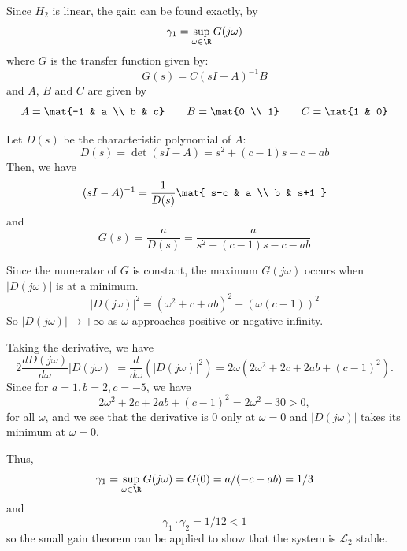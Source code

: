 \documentclass{homework}
\renewcommand{\L}{\mathcal{L}}
\begin{document}
Since $H_2$ is linear, the gain can be found exactly, by
\begin{equation*}
    \gamma_1 = \sup_{\omega \in \R} G(j\omega)
\end{equation*}
where $G$ is the transfer function given by:
\begin{equation*}
    G(s) = C(sI - A)^{-1} B
\end{equation*}
and $A$, $B$ and $C$ are given by
\begin{equation*}
    A = \mat{-1 & a \\ b & c} \qquad B = \mat{0 \\ 1}
        \qquad C = \mat{1 & 0}
\end{equation*}

Let $D(s)$ be the characteristic polynomial of $A$:
\begin{equation*}
    D(s) = \det(sI - A) = s^2 + (c - 1) s - c - ab
\end{equation*}
Then,  we have 
\begin{equation*}
    (sI - A)^{-1} = \frac{1}{D(s)} \mat{
        s-c & a \\
        b & s+1
    }
\end{equation*}
and
\begin{equation*}
    G(s) = \frac{a}{D(s)} = \frac{a}{s^2 - (c-1) s - c - ab}
\end{equation*}

Since the numerator of $G$ is constant, the maximum $G(j\omega)$
occurs when $|D(j\omega)|$ is at a minimum.
\begin{equation*}
    |D(j\omega)|^2 = (\omega^2 + c + ab)^2 + (\omega(c-1))^2
\end{equation*}
So $|D(j\omega)| \to +\infty$ as $\omega$ approaches positive or negative
infinity.

Taking the derivative, we have
\begin{equation}
    2 \frac{d D(j\omega)}{d\omega} |D(j\omega)| =
        \frac{d}{d\omega}(|D(j\omega)|^2) = 
        2\omega ( 2\omega^2 + 2c + 2ab + (c-1)^2).
    \label{eq:deriv}
\end{equation}
Since for $a = 1, b = 2, c = -5$,  we have
\begin{equation*}
    2\omega^2 + 2c + 2ab + (c-1)^2 = 2\omega^2 + 30 > 0,
\end{equation*}
for all $\omega$, and we see that the derivative is 0 only at $\omega = 0$ and $|D(j\omega)|$
takes its minimum at $\omega = 0$.

Thus,
\begin{equation*}
    \gamma_1 = \sup_{\omega \in \R} G(j\omega) = G(0) = a / (-c - ab)
        = 1/3
\end{equation*}
and
\begin{equation*}
    \gamma_1 \cdot \gamma_2 = 1/12 < 1
\end{equation*}
so the small gain theorem can be applied to show that the system
is $\L_2$ stable.
\end{document}
